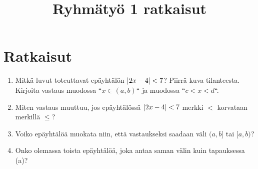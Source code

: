 \documentclass[12pt,a4paper]{article}
\title{Ryhmätyö 1 ratkaisut}
\author{}
\date{}
\begin{document}
\maketitle

\noindent

\section{Ratkaisut}

\begin{exercise}
  \leavevmode\par
\begin{enumerate}[label=\alph*), nosep]
  \item Mitkä luvut toteuttavat epäyhtälön \(\lvert2x - 4\rvert < 7\)? Piirrä
    kuva tilanteesta. Kirjoita vastaus muodossa ``\(x \in (a, b)\)`` ja
    muodossa ``\(c < x < d\)``.
  \item Miten vastaus muuttuu, jos epäyhtälössä \(\lvert2x - 4\rvert < 7\) merkki
    \(<\) korvataan merkillä \(\leq\)?
  \item Voiko epäyhtälöä muokata niin, että vastaukseksi saadaan
    väli \((a, b]\) tai \([a, b)\)?
  \item Onko olemassa toista epäyhtälöä, joka antaa saman välin kuin
    tapauksessa (a)?
\end{enumerate}
\end{exercise}
\end{document}
